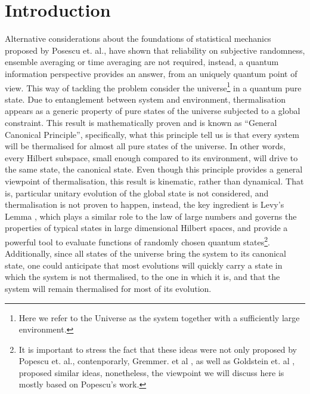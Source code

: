 
\chapter*{Introduction}

Alternative considerations about the foundations of statistical mechanics proposed by Posescu et. al.\cite{popescu_foundations_2005},  have shown that reliability on subjective randomness, ensemble averaging or time averaging are not required, instead, a quantum information perspective\cite{horodecki_partial_2005} provides an answer, from an uniquely quantum point of view. This way of tackling the problem consider the universe\footnote{Here we refer to the Universe as the system together with a sufficiently large environment.} in a quantum pure state. Due to entanglement between system and environment, thermalisation appears as a generic property of pure states of the universe subjected to a global constraint. This result is mathematically proven and is known as ``General Canonical Principle'', specifically, what this principle tell us is that every system will be thermalised for almost all pure states of the universe. In other words, every Hilbert subspace, small enough compared to its environment, will drive to the same state, the canonical state. Even though this principle provides a general viewpoint of thermalisation, this result is kinematic, rather than dynamical. That is, particular unitary evolution of the global state is not considered, and thermalisation is not proven to happen, instead, the key ingredient is Levy's Lemma \cite{milman_asymptotic_2009,ledoux_concentration_2005}, which plays a similar role to the law of large numbers and governs the properties of typical states in large dimensional Hilbert spaces\cite{popescu_foundations_2005}, and provide a powerful tool to evaluate functions of randomly chosen quantum states\footnote{It is important to stress the fact that these ideas were not only proposed by Popescu et. al., contenporarly,  Gremmer. et al \cite{gemmer_quantum_2004}, as well as Goldstein et. al \cite{goldstein_canonical_2006}, proposed similar ideas, nonetheless, the viewpoint we will discuss here is mostly based on Popescu's work.}.  Additionally, since all states of the universe bring the system to its canonical state, one could anticipate that most evolutions will quickly carry a state in which the system is not thermalised, to the one in which it is, and that the system will remain thermalised for most of its evolution.\\

